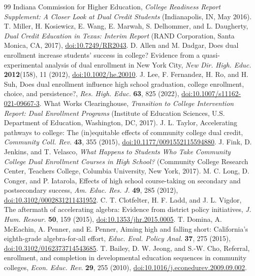 \documentclass[aps,prd,reprint,superscriptaddress,nofootinbib,floatfix]{revtex4-2}
\begin{document}
\begin{thebibliography}{99}
 Indiana Commission for Higher Education, \textit{College Readiness Report Supplement: A Closer Look at Dual Credit Students} (Indianapolis, IN, May 2016).
 T. Miller, H. Kosiewicz, E. Wang, E. Marwah, S. Delhommer, and L. Daugherty, \textit{Dual Credit Education in Texas: Interim Report} (RAND Corporation, Santa Monica, CA, 2017), \href{https://doi.org/10.7249/RR2043}{doi:10.7249/RR2043}.
 D. Allen and M. Dadgar, Does dual enrollment increase students' success in college? Evidence from a quasi-experimental analysis of dual enrollment in New York City, \textit{New Dir. High. Educ.} \textbf{2012}(158), 11 (2012), \href{https://doi.org/10.1002/he.20010}{doi:10.1002/he.20010}.
 J. Lee, F. Fernandez, H. Ro, and H. Suh, Does dual enrollment influence high school graduation, college enrollment, choice, and persistence?, \textit{Res. High. Educ.} \textbf{63}, 825 (2022), \href{https://doi.org/10.1007/s11162-021-09667-3}{doi:10.1007/s11162-021-09667-3}.
 What Works Clearinghouse, \textit{Transition to College Intervention Report: Dual Enrollment Programs} (Institute of Education Sciences, U.S. Department of Education, Washington, DC, 2017).
 J. L. Taylor, Accelerating pathways to college: The (in)equitable effects of community college dual credit, \textit{Community Coll. Rev.} \textbf{43}, 355 (2015), \href{https://doi.org/10.1177/0091552115594880}{doi:10.1177/0091552115594880}.
 J. Fink, D. Jenkins, and T. Velasco, \textit{What Happens to Students Who Take Community College Dual Enrollment Courses in High School?} (Community College Research Center, Teachers College, Columbia University, New York, 2017).
 M. C. Long, D. Conger, and P. Iatarola, Effects of high school course-taking on secondary and postsecondary success, \textit{Am. Educ. Res. J.} \textbf{49}, 285 (2012), \href{https://doi.org/10.3102/0002831211431952}{doi:10.3102/0002831211431952}.
 C. T. Clotfelter, H. F. Ladd, and J. L. Vigdor, The aftermath of accelerating algebra: Evidence from district policy initiatives, \textit{J. Hum. Resour.} \textbf{50}, 159 (2015), \href{https://doi.org/10.1353/jhr.2015.0005}{doi:10.1353/jhr.2015.0005}.
 T. Domina, A. McEachin, A. Penner, and E. Penner, Aiming high and falling short: California's eighth-grade algebra-for-all effort, \textit{Educ. Eval. Policy Anal.} \textbf{37}, 275 (2015), \href{https://doi.org/10.3102/0162373714543685}{doi:10.3102/0162373714543685}.
 T. Bailey, D. W. Jeong, and S.-W. Cho, Referral, enrollment, and completion in developmental education sequences in community colleges, \textit{Econ. Educ. Rev.} \textbf{29}, 255 (2010), \href{https://doi.org/10.1016/j.econedurev.2009.09.002}{doi:10.1016/j.econedurev.2009.09.002}.

\end{thebibliography}
\end{document}
